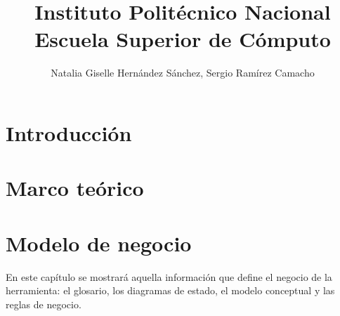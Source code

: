 \documentclass[10pt]{book}
\title{Instituto Politécnico Nacional \\           Escuela Superior de Cómputo}
\author{Natalia Giselle Hernández Sánchez, Sergio Ramírez Camacho}
\begin{document}


\thispagestyle{empty}
\maketitle

\frontmatter
\tableofcontents
\listoffigures
\mainmatter

 \hideControlVersion

\chapter{Introducción}\label{chp:introduccion}
\hypertarget{chp:introduccion}{}

\chapter{Marco teórico}\label{chp:marcoTeorico} 
\hypertarget{chp:marcoTeorico}{}

\chapter{Modelo de negocio}\label{chp:modeloNegocios}
\hypertarget{chp:modeloNegocios}{}
En este capítulo se mostrará aquella información que define el negocio de la herramienta: el glosario, los diagramas de estado, el modelo conceptual 
y las reglas de negocio.\\
\end{document}

